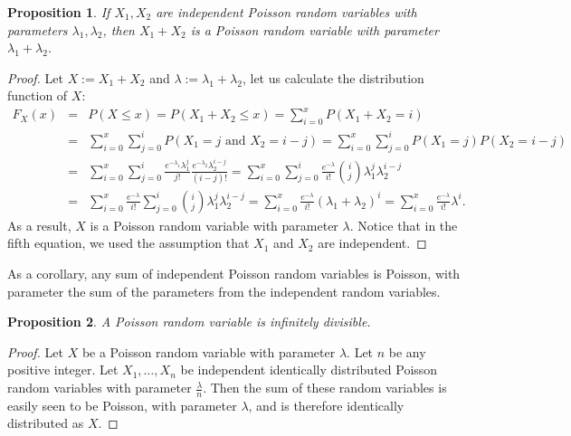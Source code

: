 \documentclass[12pt]{article}
\newtheorem{prop}{Proposition}
\begin{document}
\begin{prop} If $X_1,X_2$ are independent Poisson random variables with parameters $\lambda_1,\lambda_2$, then $X_1+X_2$ is a Poisson random variable with parameter $\lambda_1+\lambda_2$. \end{prop}
\begin{proof}  Let $X:=X_1+X_2$ and $\lambda:=\lambda_1+\lambda_2$, let us calculate the distribution function of $X$:
\begin{eqnarray*}
F_X(x) &=& P(X\le x) = P(X_1+X_2\le x) = \sum_{i=0}^x P(X_1+X_2=i) \\
&=& \sum_{i=0}^x \sum_{j=0}^i P(X_1=j \mbox{ and } X_2=i-j) = \sum_{i=0}^x \sum_{j=0}^i P(X_1=j)P(X_2=i-j) \\
&=& \sum_{i=0}^x \sum_{j=0}^i \frac{e^{-\lambda_1} \lambda_1^j}{j!} \frac{e^{-\lambda_2} \lambda_2^{i-j}}{(i-j)!} 
= \sum_{i=0}^x \sum_{j=0}^i \frac{e^{-\lambda}}{i!} \binom{i}{j} \lambda_1^j \lambda_2^{i-j} \\
&=& \sum_{i=0}^x \frac{e^{-\lambda}}{i!} \sum_{j=0}^i \binom{i}{j} \lambda_1^j \lambda_2^{i-j} = \sum_{i=0}^x \frac{e^{-\lambda}}{i!} (\lambda_1+\lambda_2)^i = \sum_{i=0}^x \frac{e^{-\lambda}}{i!} \lambda^i.
\end{eqnarray*}
As a result, $X$ is a Poisson random variable with parameter $\lambda$.  Notice that in the fifth equation, we used the assumption that $X_1$ and $X_2$ are independent.
\end{proof}

As a corollary, any sum of independent Poisson random variables is Poisson, with parameter the sum of the parameters from the independent random variables.

\begin{prop} A Poisson random variable is infinitely divisible. \end{prop}
\begin{proof}  Let $X$ be a Poisson random variable with parameter $\lambda$.  Let $n$ be any positive integer.  Let $X_1,\ldots, X_n$ be independent identically distributed Poisson random variables with parameter $\frac{\lambda}{n}$.  Then the sum of these random variables is easily seen to be Poisson, with parameter $\lambda$, and is therefore identically distributed as $X$.
\end{proof}
\end{document}
